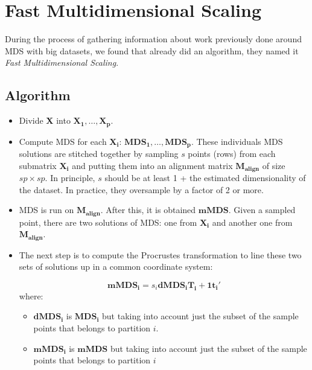 \documentclass[11pt]{report}
\begin{document}
\section{Fast Multidimensional Scaling}
During the process of gathering information about work previously done around
MDS with big datasets, we found that  already did an 
algorithm, they named it \textit{Fast Multidimensional Scaling}. 


\subsection{Algorithm}

\begin{itemize}

\item Divide \textbf{X} into $\mathbf{X_1},\dots, \mathbf{X_p}$.

\item Compute MDS for each $\mathbf{X_i}$: 
$\mathbf{MDS_1}, \dots, \mathbf{MDS_p}$. These individuals MDS solutions are 
stitched together by sampling $s$ points (rows) from each submatrix 
$\mathbf{X_i}$ and putting them into an alignment matrix 
$\mathbf{M_{align}}$ of size $sp \times sp$. In principle, $s$ should be at 
least 1 + the estimated dimensionality of the dataset. In practice, they 
oversample by a factor of 2 or more. 

\item MDS is run on $\mathbf{M_{align}}$. After this, it is obtained
$\mathbf{mMDS}$. Given a sampled point, there are two solutions of MDS: 
one from $\mathbf{X_i}$ and another one from $\mathbf{M_{align}}$.

\item The next step is to compute the Procrustes transformation to  line  
these two sets of solutions up in a common coordinate system:

\[
\mathbf{mMDS_i} = s_i \mathbf{dMDS_i} \mathbf{T_i} + \mathbf{1t_i}'
\]
where:

\begin{itemize}

\item $\mathbf{dMDS_i}$ is $\mathbf{MDS_i}$ but taking into account just
the subset of the sample points that belongs to partition $i$.

\item $\mathbf{mMDS_i}$ is $\mathbf{mMDS}$ but taking into account just
the subset of the sample points that belongs to partition $i$
\end{itemize}


\end{itemize}
\end{document}
